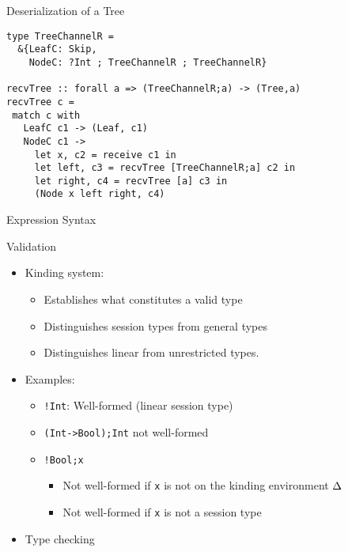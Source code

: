 \documentclass[unknownkeysallowed]{beamer}
\begin{document}
\begin{frame}[fragile]{Deserialization of a Tree}
  \begin{lstlisting}
type TreeChannelR =
  &{LeafC: Skip,
    NodeC: ?Int ; TreeChannelR ; TreeChannelR}

recvTree :: forall a => (TreeChannelR;a) -> (Tree,a)
recvTree c =
 match c with
   LeafC c1 -> (Leaf, c1)
   NodeC c1 ->
     let x, c2 = receive c1 in
     let left, c3 = recvTree [TreeChannelR;a] c2 in
     let right, c4 = recvTree [a] c3 in
     (Node x left right, c4)
\end{lstlisting}
\end{frame}

\begin{frame}[fragile, shrink=20]{Expression Syntax}
  
\end{frame}

\begin{frame}[fragile]{Validation}
  \begin{itemize}
  \item Kinding system:
    \begin{itemize}
    \item Establishes what constitutes a valid type
    \item Distinguishes session types from general types
    \item Distinguishes linear from unrestricted types.
    \end{itemize}
  \vspace{0.3cm}  
  \item Examples:
    \begin{itemize}
    \item \lstinline|!Int|: Well-formed (linear session type)
    \item \lstinline|(Int->Bool);Int| not well-formed
    \item \lstinline|!Bool;x|
      \begin{itemize}
      \item Not well-formed if \lstinline|x| is not on the kinding environment $\Delta$
      \item Not well-formed if \lstinline|x| is not a session type
      \end{itemize}
    \end{itemize}
  \vspace{0.3cm}      
  \item Type checking
  \end{itemize}
\end{frame}
\end{document}

